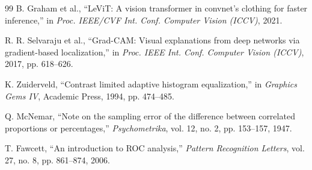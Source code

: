 \documentclass[conference,9pt]{IEEEtran}
\begin{document}
\begin{thebibliography}{99}
B. Graham et al., “LeViT: A vision transformer in convnet’s clothing for faster inference,” in \emph{Proc. IEEE/CVF Int. Conf. Computer Vision (ICCV)}, 2021.

R. R. Selvaraju et al., “Grad-CAM: Visual explanations from deep networks via gradient-based localization,” in \emph{Proc. IEEE Int. Conf. Computer Vision (ICCV)}, 2017, pp. 618–626.

K. Zuiderveld, “Contrast limited adaptive histogram equalization,” in \emph{Graphics Gems IV}, Academic Press, 1994, pp. 474–485.

Q. McNemar, “Note on the sampling error of the difference between correlated proportions or percentages,” \emph{Psychometrika}, vol. 12, no. 2, pp. 153–157, 1947.

T. Fawcett, “An introduction to ROC analysis,” \emph{Pattern Recognition Letters}, vol. 27, no. 8, pp. 861–874, 2006.


\end{thebibliography}
\end{document}
